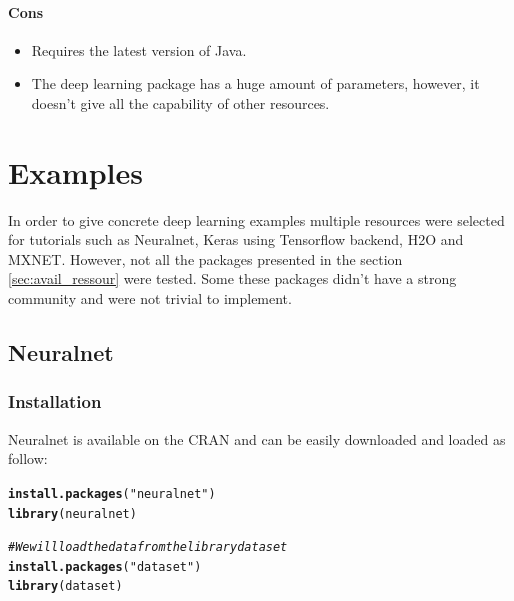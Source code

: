 \documentclass[letter,8pt]{article}\usepackage[]{graphicx}\usepackage[]{color}
\makeatletter
\newcommand{\hlstr}[1]{\textcolor[rgb]{0.192,0.494,0.8}{#1}}%
\newcommand{\hlcom}[1]{\textcolor[rgb]{0.678,0.584,0.686}{\textit{#1}}}%
\newcommand{\hlstd}[1]{\textcolor[rgb]{0.345,0.345,0.345}{#1}}%
\newcommand{\hlkwd}[1]{\textcolor[rgb]{0.737,0.353,0.396}{\textbf{#1}}}%
\newenvironment{kframe}{%
 \def\at@end@of@kframe{}%
 \ifinner\ifhmode%
  \def\at@end@of@kframe{\end{minipage}}%
  \begin{minipage}{\columnwidth}%
 \fi\fi%
 \def\FrameCommand##1{\hskip\@totalleftmargin \hskip-\fboxsep
 \colorbox{shadecolor}{##1}\hskip-\fboxsep
     \hskip-\linewidth \hskip-\@totalleftmargin \hskip\columnwidth}%
 \MakeFramed {\advance\hsize-\width
   \@totalleftmargin\z@ \linewidth\hsize
   \@setminipage}}%
 {\par\unskip\endMakeFramed%
 \at@end@of@kframe}
\newenvironment{knitrout}{}{} %
\makeatother
\begin{document}
\paragraph{Cons}
\begin{itemize}
\item Requires the latest version of Java.
\item The deep learning package has a huge amount of parameters, however, it doesn't give all the capability of other resources.
\end{itemize}

\section{Examples}

\label{sec:examples}
In order to give concrete deep learning examples multiple resources were selected for tutorials such as Neuralnet, Keras using Tensorflow backend, H2O and MXNET. However, not all the packages presented in the section \ref{sec:avail_ressour} were tested. Some these packages didn't have a strong community and were not trivial to implement. 
\subsection{Neuralnet}
\subsubsection{Installation}
Neuralnet is available on the CRAN and can be easily downloaded and loaded as follow:
\begin{knitrout}
\color{fgcolor}\begin{kframe}
\begin{alltt}
\hlkwd{install.packages}\hlstd{(}\hlstr{"neuralnet"}\hlstd{)}
\hlkwd{library}\hlstd{(neuralnet)}

\hlcom{# We will load the data from the library dataset}
\hlkwd{install.packages}\hlstd{(}\hlstr{"dataset"}\hlstd{)}
\hlkwd{library}\hlstd{(dataset)}
\end{alltt}
\end{kframe}
\end{knitrout}
\end{document}
